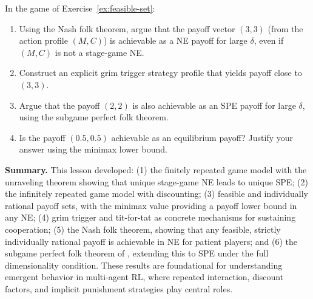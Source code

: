\documentclass[11pt,a4paper]{article}
\begin{document}
\begin{exercise}
\label{ex:folk-application}
In the game of Exercise~\ref{ex:feasible-set}:
\begin{enumerate}[label=(\alph*)]
    \item Using the Nash folk theorem, argue that the payoff vector $(3,3)$
    (from the action profile $(M,C)$) is achievable as a NE payoff for
    large $\delta$, even if $(M,C)$ is not a stage-game NE.
    \item Construct an explicit grim trigger strategy profile that yields
    payoff close to $(3,3)$.
    \item Argue that the payoff $(2,2)$ is also achievable as an SPE payoff
    for large $\delta$, using the subgame perfect folk theorem.
    \item Is the payoff $(0.5, 0.5)$ achievable as an equilibrium payoff?
    Justify your answer using the minimax lower bound.
\end{enumerate}
\end{exercise}

\bigskip

\noindent\textbf{Summary.} This lesson developed: (1) the finitely repeated
game model with the unraveling theorem showing that unique stage-game NE
leads to unique SPE; (2) the infinitely repeated game model with
discounting; (3) feasible and individually rational payoff sets, with the
minimax value providing a payoff lower bound in any NE; (4) grim trigger and
tit-for-tat as concrete mechanisms for sustaining cooperation; (5) the Nash
folk theorem, showing that any feasible, strictly individually rational
payoff is achievable in NE for patient players; and (6) the subgame perfect
folk theorem of \citet{fudenberg1986}, extending this to SPE under the full
dimensionality condition. These results are foundational for understanding
emergent behavior in multi-agent RL, where repeated interaction, discount
factors, and implicit punishment strategies play central roles.

\bigskip

\end{document}

